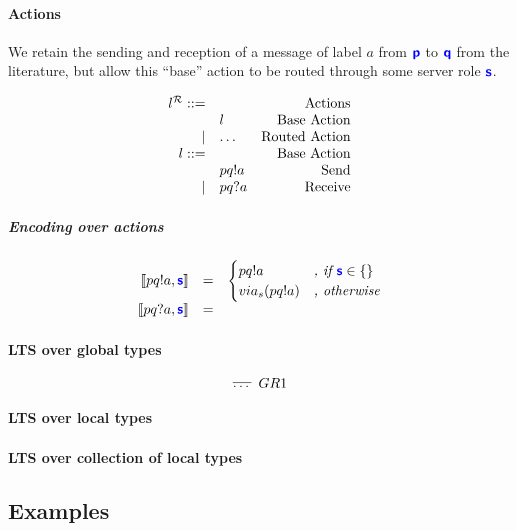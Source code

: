 \documentclass{article}
\begin{document}
\paragraph{Actions}
We retain the sending and reception of a message of label $a$ from ${\color{blue}\bm{\mathsf{p}}}$
to ${\color{blue}\bm{\mathsf{q}}}$ from the literature, but allow this ``base'' action to be
routed through some server role ${\color{blue}\bm{\mathsf{s}}}$.

\doublespacing
\[
\begin{array}{rlr}
	l^{\mathcal{R}} ::= &  & \text{Actions} \\
	& l & \text{Base Action} \\
	\mid & \dots & \text{Routed Action} \\
	
	l ::= & & \text{Base Action} \\
	& pq!a & \text{Send} \\
	\mid & pq?a & \text{Receive} \\
\end{array}
\]
\singlespacing

\subparagraph{Encoding over actions}

\doublespacing
\[
\begin{array}{rcl}
\llbracket{{pq!a}, {\color{blue}\bm{\mathsf{s}}} }\rrbracket & = & \begin{cases}
 pq!a & \textit{, if } {\color{blue}\bm{\mathsf{s}}} \in \{\} \\ 
 via_s(pq!a) & \textit{, otherwise} \end{cases}\\
\llbracket{{pq?a}, {\color{blue}\bm{\mathsf{s}}} }\rrbracket & = & \\
\end{array}
\]
\singlespacing

\paragraph{LTS over global types}

\[
\infer[GR1]{\dots}{}
\]

\paragraph{LTS over local types}

\paragraph{LTS over collection of local types}

\subsection{Examples}
\end{document}
